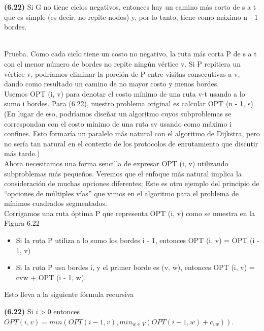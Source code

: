 \documentclass[a4paper, 12pt]{book}
\theoremstyle{dotless}
\begin{document}
\colorbox{mygray}{\parbox{15cm}{
\textbf{(6.22)} Si G no tiene ciclos negativos, entonces hay un camino más corto de s a t que es simple (es decir, no repite nodos) y, por lo tanto, tiene como máximo n - 1 bordes.}}\\

Prueba. Como cada ciclo tiene un costo no negativo, la ruta más corta P de s a t con el menor número de bordes no repite ningún vértice v. Si P repitiera un vértice v, podríamos eliminar la porción de P entre visitas consecutivas a v, dando como resultado un camino de no mayor costo y menos bordes.\\

Usemos OPT (i, v) para denotar el costo mínimo de una ruta v-t usando a lo sumo i bordes. Para (6.22), nuestro problema original es calcular OPT (n - 1, s). (En lugar de eso, podríamos diseñar un algoritmo cuyos subproblemas se correspondan con el costo mínimo de una ruta sv usando como máximo i confines. Esto formaría un paralelo más natural con el algoritmo de Dijkstra, pero no sería tan natural en el contexto de los protocolos de enrutamiento que discutir más tarde.)\\

Ahora necesitamos una forma sencilla de expresar OPT (i, v) utilizando subproblemas más pequeños. Veremos que el enfoque más natural implica la consideración de muchas opciones diferentes; Este es otro ejemplo del principio de ``opciones de múltiples vías'' que vimos en el algoritmo para el problema de mínimos cuadrados segmentados.\\

Corrigamos una ruta óptima P que representa OPT (i, v) como se muestra en la Figura 6.22\\

\begin{itemize}
    \item Si la ruta P utiliza a lo sumo los bordes i - 1, entonces OPT (i, v) = OPT (i - 1, v)
    \item Si la ruta P usa bordes i, y el primer borde es (v, w), entonces OPT (i, v) = cvw + OPT (i - 1, w).
\end{itemize}

Esto lleva a la siguiente fórmula recursiva\\

\colorbox{mygray}{\parbox{15cm}{
\textbf{(6.22)} Si $i > 0$ entonces $OPT(i, v) = min(OPT(i − 1, v), min_{w \in V} (OPT(i − 1, w) + c_{vw}))$.}}\\
\end{document}
